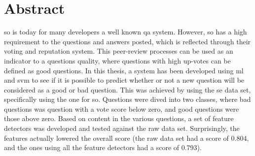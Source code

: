 \chapter*{Abstract}
\gls{so} is today for many developers a well known \gls{qa} system. 
However, \gls{so} has a high requirement to the questions and answers posted, which is reflected through their voting and reputation system. 
This peer-review processes can be used as an indicator to a questions quality, where questions with high up-votes can be defined as good questions.
In this thesis, a system has been developed using  \gls{ml} and \gls{svm} to see if it is possible to predict whether or not a new question will be 
considered as a good or bad question. 
\vspace{0.5em}\newline
This was achieved by using the \gls{se} data set, specifically using the one for \gls{so}. 
Questions were dived into two classes, where bad questions was question with a vote score below zero, and good questions were those above zero. 
Based on content in the various questions, a set of feature detectors was developed and tested against the raw data set. 
Surprisingly, the features actually lowered the overall score (the raw data set had a score of 0.804, and the ones using all the feature detectors had a score of 0.793). \\


